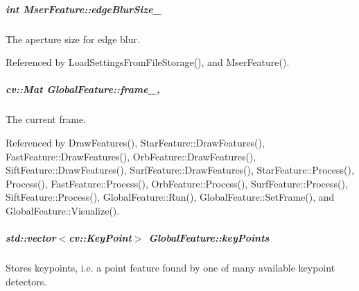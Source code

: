\hypertarget{group___feature_extractor_a1850b5af2915831475ef9d776e8a72ea}{
\subparagraph[{edge\-Blur\-Size\-\_\-}]{\setlength{\rightskip}{0pt plus 5cm}int Mser\-Feature\-::edge\-Blur\-Size\-\_\-\hspace{0.3cm}{\ttfamily [private]}}}\label{group___feature_extractor_a1850b5af2915831475ef9d776e8a72ea}


The aperture size for edge blur. 



Referenced by Load\-Settings\-From\-File\-Storage(), and Mser\-Feature().

\hypertarget{group___feature_extractor_aae4295da2c3999edcb99b46d70ee7166}{
\subparagraph[{frame\-\_\-}]{\setlength{\rightskip}{0pt plus 5cm}cv\-::\-Mat Global\-Feature\-::frame\-\_\-\hspace{0.3cm}{\ttfamily [protected]}, {\ttfamily [inherited]}}}\label{group___feature_extractor_aae4295da2c3999edcb99b46d70ee7166}


The current frame. 



Referenced by Draw\-Features(), Star\-Feature\-::\-Draw\-Features(), Fast\-Feature\-::\-Draw\-Features(), Orb\-Feature\-::\-Draw\-Features(), Sift\-Feature\-::\-Draw\-Features(), Surf\-Feature\-::\-Draw\-Features(), Star\-Feature\-::\-Process(), Process(), Fast\-Feature\-::\-Process(), Orb\-Feature\-::\-Process(), Surf\-Feature\-::\-Process(), Sift\-Feature\-::\-Process(), Global\-Feature\-::\-Run(), Global\-Feature\-::\-Set\-Frame(), and Global\-Feature\-::\-Visualize().

\hypertarget{group___feature_extractor_a72cc606c0090a64718a7e92bca7520b9}{
\subparagraph[{key\-Points}]{\setlength{\rightskip}{0pt plus 5cm}std\-::vector$<$cv\-::\-Key\-Point$>$ Global\-Feature\-::key\-Points\hspace{0.3cm}{\ttfamily [inherited]}}}\label{group___feature_extractor_a72cc606c0090a64718a7e92bca7520b9}


Stores keypoints, i.\-e. a point feature found by one of many available keypoint detectors. 



